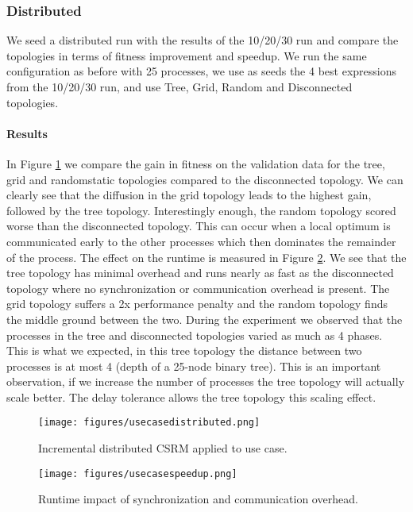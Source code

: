 \subsubsection{Distributed}
We seed a distributed run with the results of the 10/20/30 run and compare the topologies in terms of fitness improvement and speedup.
We run the same configuration as before with 25 processes, we use as seeds the 4 best expressions from the 10/20/30 run, and use Tree, Grid, Random and Disconnected topologies.
\paragraph{Results}
In Figure \ref{fig:usecasedistributed} we compare the gain in fitness on the validation data for the tree, grid and randomstatic topologies compared to the disconnected topology. We can clearly see that the diffusion in the grid topology leads to the highest gain, followed by the tree topology. Interestingly enough, the random topology scored worse than the disconnected topology. This can occur when a local optimum is communicated early to the other processes which then dominates the remainder of the process. The effect on the runtime is measured in Figure \ref{fig:usecasespeedup}. We see that the tree topology has minimal overhead and runs nearly as fast as the disconnected topology where no synchronization or communication overhead is present. The grid topology suffers a 2x performance penalty and the random topology finds the middle ground between the two. During the experiment we observed that the processes in the tree and disconnected topologies varied as much as 4 phases. This is what we expected, in this tree topology the distance between two processes is at most 4 (depth of a 25-node binary tree). This is an important observation, if we increase the number of processes the tree topology will actually scale better. The delay tolerance allows the tree topology this scaling effect.
\begin{figure}
    \centering
    \texttt{[image: figures/usecasedistributed.png]}
    \caption{Incremental distributed CSRM applied to use case.}
    \label{fig:usecasedistributed}
\end{figure}
\begin{figure}
    \centering
    \texttt{[image: figures/usecasespeedup.png]}
    \caption{Runtime impact of synchronization and communication overhead.}
    \label{fig:usecasespeedup}
\end{figure}

